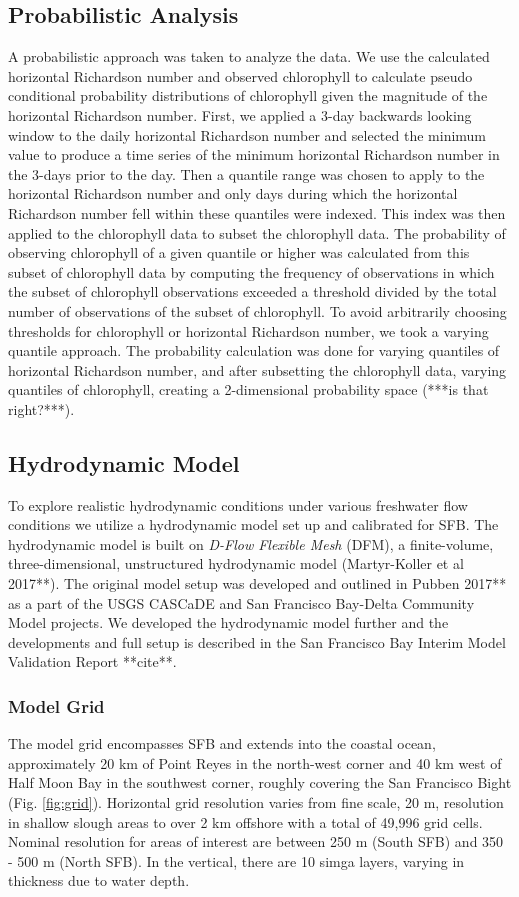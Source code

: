 \documentclass[preprint,review,12pt]{elsarticle}
\begin{document}
\subsection{Probabilistic Analysis}
A probabilistic approach was taken to analyze the data. We use the calculated horizontal Richardson number and observed chlorophyll to calculate pseudo conditional probability distributions of chlorophyll given the magnitude of the horizontal Richardson number. First, we applied a 3-day backwards looking window to the daily horizontal Richardson number and selected the minimum value to produce a time series of the minimum horizontal Richardson number in the 3-days prior to the day. Then a quantile range was chosen to apply to the horizontal Richardson number and only days during which the horizontal Richardson number fell within these quantiles were indexed. This index was then applied to the chlorophyll data to subset the chlorophyll data. The probability of observing chlorophyll of a given quantile or higher was calculated from this subset of chlorophyll data by computing the frequency of observations in which the subset of chlorophyll observations exceeded a threshold divided by the total number of observations of the subset of chlorophyll. To avoid arbitrarily choosing thresholds for chlorophyll or horizontal Richardson number, we took a varying quantile approach. The probability calculation was done for varying quantiles of horizontal Richardson number, and after subsetting the chlorophyll data, varying quantiles of chlorophyll, creating a 2-dimensional probability space (***is that right?***). 


\subsection{Hydrodynamic Model}\label{S:model}
To explore realistic hydrodynamic conditions under various freshwater flow conditions we utilize a hydrodynamic model set up and calibrated for SFB. The hydrodynamic model is built on {\em D-Flow Flexible Mesh} (DFM), a finite-volume, three-dimensional, unstructured hydrodynamic model (Martyr-Koller et al 2017**). The original model setup was developed and outlined in Pubben 2017** as a part of the USGS CASCaDE and San Francisco Bay-Delta Community Model projects. We developed the hydrodynamic model further and the developments and full setup is described in the San Francisco Bay Interim Model Validation Report **cite**.

\subsubsection{Model Grid}
The model grid encompasses SFB and extends into the coastal ocean, approximately 20 km of Point Reyes in the north-west corner and 40 km west of Half Moon Bay in the southwest corner, roughly covering the San Francisco Bight (Fig. \ref{fig:grid}). Horizontal grid resolution varies from fine scale, 20 m, resolution in shallow slough areas to over 2 km offshore with a total of 49,996 grid cells. Nominal resolution for areas of interest are between 250 m (South SFB) and 350 - 500 m (North SFB). In the vertical, there are 10 simga layers, varying in thickness due to water depth. 
\end{document}
